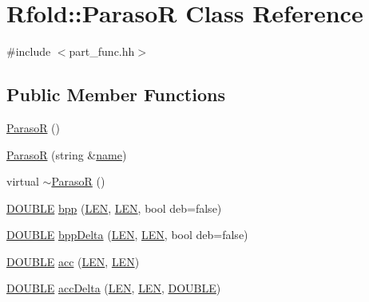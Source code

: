 \hypertarget{class_rfold_1_1_paraso_r}{\section{Rfold\+:\+:Paraso\+R Class Reference}
\label{class_rfold_1_1_paraso_r}
}


{\ttfamily \#include $<$part\+\_\+func.\+hh$>$}

\subsection*{Public Member Functions}
\begin{DoxyCompactItemize}
\item 
\hyperlink{class_rfold_1_1_paraso_r_a4870101079fdca208897c8a1539d2a2d}{Paraso\+R} ()
\item 
\hyperlink{class_rfold_1_1_paraso_r_a7fb46493c5210f215037759fbc998a7a}{Paraso\+R} (string \&\hyperlink{class_rfold_1_1_paraso_r_a52b17c1475bc8319251b6fbde1a5a6d9}{name})
\item 
virtual \hyperlink{class_rfold_1_1_paraso_r_a996162e4e9ff292e06adb53b8b923b84}{$\sim$\+Paraso\+R} ()
\item 
\hyperlink{energy__const_8hh_a8747af38b86aa2bbcda2f1b1aa0888c2}{D\+O\+U\+B\+L\+E} \hyperlink{class_rfold_1_1_paraso_r_ab78c753d80d4c1abb7288ca59c4279fa}{bpp} (\hyperlink{energy__const_8hh_a05b49c662c073f89e86804f7856622a0}{L\+E\+N}, \hyperlink{energy__const_8hh_a05b49c662c073f89e86804f7856622a0}{L\+E\+N}, bool deb=false)
\item 
\hyperlink{energy__const_8hh_a8747af38b86aa2bbcda2f1b1aa0888c2}{D\+O\+U\+B\+L\+E} \hyperlink{class_rfold_1_1_paraso_r_ae57dc155aad5d86fca61442c12fbf328}{bpp\+Delta} (\hyperlink{energy__const_8hh_a05b49c662c073f89e86804f7856622a0}{L\+E\+N}, \hyperlink{energy__const_8hh_a05b49c662c073f89e86804f7856622a0}{L\+E\+N}, bool deb=false)
\item 
\hyperlink{energy__const_8hh_a8747af38b86aa2bbcda2f1b1aa0888c2}{D\+O\+U\+B\+L\+E} \hyperlink{class_rfold_1_1_paraso_r_a70ce59c8bc0a2387ca63584e73679a09}{acc} (\hyperlink{energy__const_8hh_a05b49c662c073f89e86804f7856622a0}{L\+E\+N}, \hyperlink{energy__const_8hh_a05b49c662c073f89e86804f7856622a0}{L\+E\+N})
\item 
\hyperlink{energy__const_8hh_a8747af38b86aa2bbcda2f1b1aa0888c2}{D\+O\+U\+B\+L\+E} \hyperlink{class_rfold_1_1_paraso_r_a46bf89fcd38a7f3cbf7b74967d935546}{acc\+Delta} (\hyperlink{energy__const_8hh_a05b49c662c073f89e86804f7856622a0}{L\+E\+N}, \hyperlink{energy__const_8hh_a05b49c662c073f89e86804f7856622a0}{L\+E\+N}, \hyperlink{energy__const_8hh_a8747af38b86aa2bbcda2f1b1aa0888c2}{D\+O\+U\+B\+L\+E})

\end{DoxyCompactItemize}
